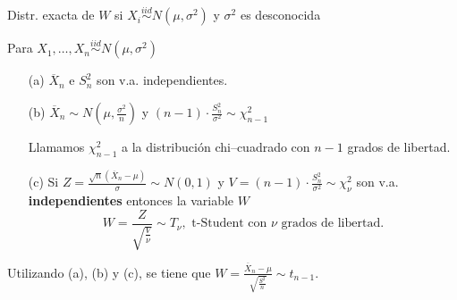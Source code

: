 \documentclass{beamer}
\theoremstyle{definition}
\begin{document}
\begin{frame}{\color{rosee} Distr. exacta de $W$ si $X_i\stackrel{iid}{\sim}N(\mu,\sigma^2)$ y $\sigma^2$ es desconocida}\small

Para $X_1,\dots,X_n\stackrel{iid}{\sim}N(\mu,\sigma^2)$%
\medskip
\begin{itemize}
\item[(a)] $\overline{X}_n$ e $S_n^2$ son v.a. independientes.\medskip
\item[(b)] $\overline{X}_n\sim N\left(\mu, \frac{\sigma^2}{n}\right)$ y $(n-1)\cdot \frac{S_n^2}{\sigma^2}\sim \chi^2_{n-1}$ 

Llamamos $\chi^2_{n-1}$ a la distribución chi--cuadrado con $n-1$ grados de libertad.\medskip
\item[(c)] Si $Z=\frac{\sqrt{n}(\overline{X}_n-\mu)}{\sigma}\sim N(0,1)$ y $V=(n-1)\cdot \frac{S_n^2}{\sigma^2}\sim\chi^2_{\nu}$ son v.a. \textbf{independientes} entonces la variable $W$
$$ W=\frac{Z}{\sqrt{\frac{V}{\nu}}} \sim T_{\nu}, \text{ t-Student con } \nu \text{  grados de libertad}.$$
\end{itemize}
Utilizando (a), (b) y (c), se tiene que $ W=\frac{\overline{X}_n-\mu}{\sqrt{\frac{S^2}{n}}}\sim t_{n-1}$.

\end{frame}
\end{document}
